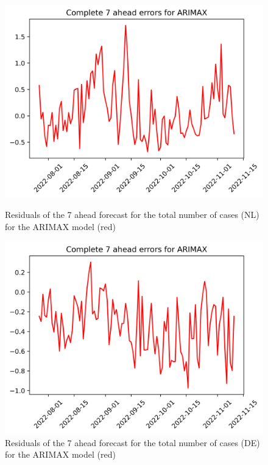 \begin{figure}

\begin{minipage}{.32\textwidth}
  \centering
  \includegraphics[width=\linewidth]{pics/7_ah/7_ahead_errors_ARIMAX.png}
  \caption{Residuals of the 7 ahead forecast for the total number of cases (NL) for the ARIMAX model (red)}
  \label{fig:tot_cases_error_7_ARIMAX}
\end{minipage}
\begin{minipage}{.32\textwidth}
  \centering
  \includegraphics[width=\linewidth]{pics/7_ah/DE_7_ahead_errors_ARIMAX.png}
  \caption{Residuals of the 7 ahead forecast for the total number of cases (DE) for the ARIMAX model (red)}
  \label{fig:tot_cases_error_7_ARIMAX_DE}

\end{minipage}
\end{figure}
